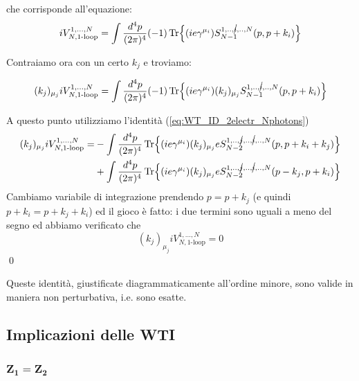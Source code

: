 \documentclass[../main.tex]{subfiles}
\begin{document}
che corrisponde all'equazione:
\begin{equation}
    iV_{N, \text{1-loop}}^{1,...,N} = \int\frac{d^4p}{(2\pi)^4}(-1)\Tr{(ie\gamma^{\mu_i})S_{N-1}^{1,..,\cancel{i},..,N}(p, p+k_i) }
\end{equation}

Contraiamo ora con un certo $k_j$ e troviamo:

\[(k_j)_{\mu_j}iV_{N, \text{1-loop}}^{1,...,N} = \int\frac{d^4p}{(2\pi)^4}(-1)\Tr{(ie\gamma^{\mu_i})(k_j)_{\mu_j}S_{N-1}^{1,..,\cancel{i},..,N}(p, p+k_i) }\]

A questo punto utilizziamo l'identità (\ref{eq:WT_ID_2electr_Nphotons}) 
\begin{align*}
    (k_j)_{\mu_j}iV_{N, \text{1-loop}}^{1,...,N} = &-\int\frac{d^4p}{(2\pi)^4}\Tr{(ie\gamma^{\mu_i})(k_j)_{\mu_j}eS_{N-2}^{1,..,\cancel{j},..,\cancel{i},..,N}(p, p+k_i+k_j) } \\
    &+ \int\frac{d^4p}{(2\pi)^4}\Tr{(ie\gamma^{\mu_i})(k_j)_{\mu_j}eS_{N-2}^{1,..,\cancel{j},..,\cancel{i},..,N}(p-k_j, p+k_i) }
\end{align*}
Cambiamo variabile di integrazione prendendo \(p=p+k_j\) (e quindi \(p + k_i=p+k_j+k_i\)) ed il gioco è fatto: i due termini sono uguali a meno del segno ed abbiamo verificato che 
\[
(k_j)_{\mu_j}iV_{N, \text{1-loop}}^{1,...,N} = 0
\]\qed

\begin{nota}
    Queste identità, giustificate diagrammaticamente all'ordine minore, sono valide in maniera non perturbativa, i.e. sono esatte.
\end{nota}

\subsection{Implicazioni delle WTI}
\subsubsection{\(\mathbf{Z_1 = Z_2}\)}
\end{document}
